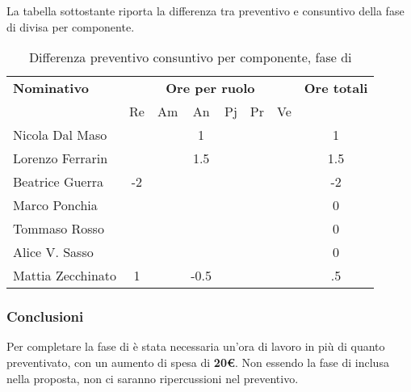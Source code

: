 La tabella sottostante riporta la differenza tra preventivo e consuntivo della fase di \AR{} divisa per componente.
\begin{table}[H]
	\centering
	\begin{tabular}{|l|c|c|c|c|c|c|c|}
		\hline
		\textbf{Nominativo} & 
		\multicolumn{6}{c|}{\textbf{Ore per ruolo}} & 
		\textbf{Ore totali} \\
		& Re & Am & An & Pj & Pr & Ve & \\
		\hline
		Nicola Dal Maso & & &1 & & & & 1 \\
		Lorenzo Ferrarin & & &1.5 & & & & 1.5 \\
		Beatrice Guerra & -2 & & & & & & -2 \\
		Marco Ponchia & & & & & & & 0 \\
		Tommaso Rosso & & & & & & & 0 \\
		Alice V. Sasso & & & & & & & 0 \\
		Mattia Zecchinato & 1& &-0.5 & & & & .5  \\
		\hline
	\end{tabular}
	\caption{Differenza preventivo consuntivo per componente, fase di \AR}
\end{table}
\subsubsection{Conclusioni}
Per completare la fase di \AR{} è stata necessaria un'ora di lavoro in più di quanto preventivato, con un aumento di spesa di \textbf{20€}. Non essendo la fase di \AR{} inclusa nella proposta, non ci saranno ripercussioni nel preventivo.


